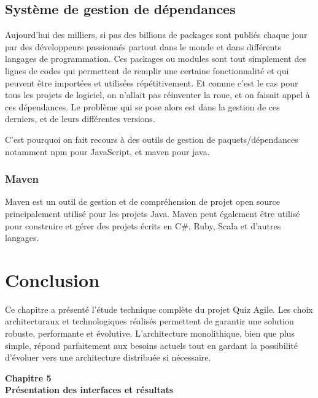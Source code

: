 \documentclass[12pt,a4paper]{report}
\begin{document}
\subsection{Système de gestion de dépendances}

Aujourd'hui des milliers, si pas des billions de packages sont publiés chaque jour par des développeurs passionnés partout dans le monde et dans différents langages de programmation. Ces packages ou modules sont tout simplement des lignes de codes qui permettent de remplir une certaine fonctionnalité et qui peuvent être importées et utilisées répétitivement. Et comme c'est le cas pour tous les projets de logiciel, on n'allait pas réinventer la roue, et on faisait appel à ces dépendances. Le problème qui se pose alors est dans la gestion de ces derniers, et de leurs différentes versions.

C'est pourquoi on fait recours à des outils de gestion de paquets/dépendances notamment npm pour JavaScript, et maven pour java.

\subsubsection{Maven}

Maven est un outil de gestion et de compréhension de projet open source principalement utilisé pour les projets Java. Maven peut également être utilisé pour construire et gérer des projets écrits en C\#, Ruby, Scala et d'autres langages.

\section{Conclusion}

Ce chapitre a présenté l'étude technique complète du projet Quiz Agile. Les choix architecturaux et technologiques réalisés permettent de garantir une solution robuste, performante et évolutive. L'architecture monolithique, bien que plus simple, répond parfaitement aux besoins actuels tout en gardant la possibilité d'évoluer vers une architecture distribuée si nécessaire.


\cleardoublepage
\thispagestyle{empty}
\begin{center}
    \vspace*{4cm}
    {\Huge \textbf{Chapitre 5}}\\[1.5cm]
    {\LARGE \textbf{Présentation des interfaces et résultats}}
\end{center}
\cleardoublepage
\end{document}
